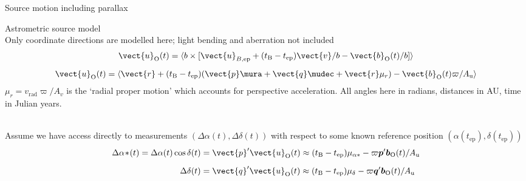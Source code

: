 \documentclass[smaller, aspectratio=169]{beamer}
\begin{document}
\begin{agaframe}[1-2]{Source motion including parallax}
\end{agaframe}
%
%
\begin{agaframe}{Astrometric source model}
  \\[3pt]
  Only coordinate directions are modelled here; light bending and aberration not included
  \begin{gather}
    \vect{u}_\mathrm{O}(t) = \langle b \times [\vect{u}_{B,\mathrm{ep}}+(t_\mathrm{B}-t_\mathrm{ep})\vect{v}/b -
    \vect{b}_\mathrm{O}(t)/b]\rangle\nonumber \\[5pt]
    \vect{u}_\mathrm{O}(t) = \langle \vect{r}+(t_\mathrm{B}-t_\mathrm{ep})
    (\vect{p}\mura + \vect{q}\mudec  + \vect{r}\mu_r) - \vect{b}_\mathrm{O}(t)\varpi/A_\mathrm{u} \rangle
    \label{eq:sourcemodelA}
  \end{gather}
  $\mu_r = v_\mathrm{rad}\varpi/A_v$ is the `radial proper motion' which accounts for perspective
  acceleration. All angles here in radians, distances in AU, time in Julian years.

  \bigskip
  \\[3pt]
  Assume we have access directly to measurements $(\Delta\alpha(t),\Delta\delta(t))$ with respect to
  some known reference position $(\alpha(t_\mathrm{ep}),\delta(t_\mathrm{ep}))$
  \begin{equation}
    \begin{aligned}
      \Delta\alpha\!\ast\!(t) = \Delta\alpha(t)\cos\delta(t) & = \vect{p}'\vect{u}_\mathrm{O}(t) \approx (t_\mathrm{B}-t_\mathrm{ep})\mu_{\alpha*} -
      \varpi\boldsymbol{p}'\boldsymbol{b}_\mathrm{O}(t)/A_\mathrm{u}\\[5pt]
      \Delta\delta(t) & = \vect{q}'\vect{u}_\mathrm{O}(t) \approx (t_\mathrm{B}-t_\mathrm{ep})\mu_{\delta} -
      \varpi\boldsymbol{q}'\boldsymbol{b}_\mathrm{O}(t)/A_\mathrm{u}
    \end{aligned}
    \label{eq:simplifiedeqs}
  \end{equation}
\end{agaframe}
\end{document}
